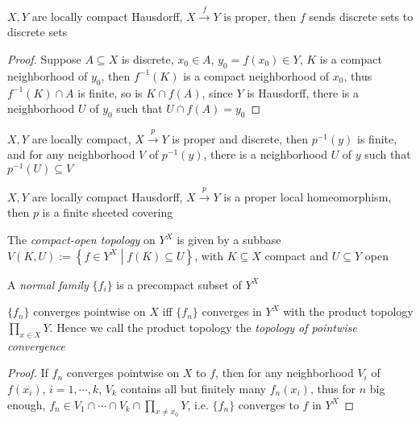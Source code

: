 \documentclass[main]{subfiles}
\begin{document}
\begin{lemma}\label{X,Y locally compact Hausdorff, f:X->Y proper, f send discrete sets to discrete sets}
$X,Y$ are locally compact Hausdorff, $X\xrightarrow{f}Y$ is proper, then $f$ sends discrete sets to discrete sets
\end{lemma}

\begin{proof}
Suppose $A\subseteq X$ is discrete, $x_0\in A$, $y_0=f(x_0)\in Y$, $K$ is a compact neighborhood of $y_0$, then $f^{-1}(K)$ is a compact neighborhood of $x_0$, thus $f^{-1}(K)\cap A$ is finite, so is $K\cap f(A)$, since $Y$ is Hausdorff, there is a neighborhood $U$ of $y_0$ such that $U\cap f(A)=y_0$
\end{proof}

\begin{lemma}
$X,Y$ are locally compact, $X\xrightarrow{p}Y$ is proper and discrete, then $p^{-1}(y)$ is finite, and for any neighborhood $V$ of $p^{-1}(y)$, there is a neighborhood $U$ of $y$ such that $p^{-1}(U)\subseteq V$
\end{lemma}

\begin{lemma}
$X,Y$ are locally compact Hausdorff, $X\xrightarrow{p}Y$ is a proper local homeomorphism, then $p$ is a finite sheeted covering
\end{lemma}

\begin{definition}
The \textit{compact-open topology} on $Y^X$ is given by a subbase $V(K,U):=\left\{f\in Y^X\middle|f(K)\subseteq U\right\}$, with $K\subseteq X$ compact and $U\subseteq Y$ open \par
A \textit{normal family} $\{f_i\}$ is a precompact subset of $Y^X$
\end{definition}

\begin{lemma}
$\{f_n\}$ converges pointwise on $X$ iff $\{f_n\}$ converges in $Y^X$ with the product topology $\displaystyle\prod_{x\in X}Y$. Hence we call the product topology the \textit{topology of pointwise convergence}
\end{lemma}

\begin{proof}
If $f_n$ converges pointwise on $X$ to $f$, then for any neighborhood $V_i$ of $f(x_i)$, $i=1,\cdots,k$, $V_k$ contains all but finitely many $f_n(x_i)$, thus for $n$ big enough, $\displaystyle f_n\in V_1\cap\cdots\cap V_k\cap\prod_{x\neq x_0}Y$, i.e. $\{f_n\}$ converges to $f$ in $Y^X$
\end{proof}
\end{document}
